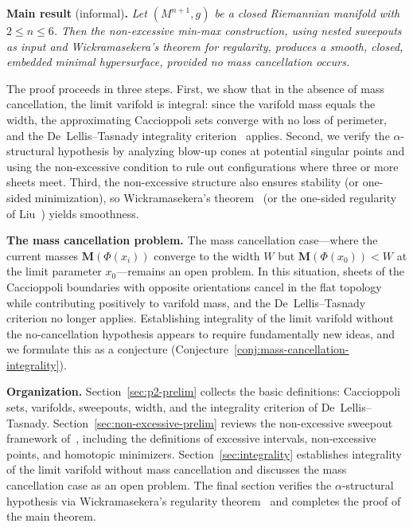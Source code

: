 \noindent\textbf{Main result} (informal)\textbf{.}
\textit{Let $(M^{n+1}, g)$ be a closed Riemannian manifold with $2 \leq n \leq 6$. Then the non-excessive min-max construction, using nested sweepouts as input and Wickramasekera's theorem for regularity, produces a smooth, closed, embedded minimal hypersurface, provided no mass cancellation occurs.}

The proof proceeds in three steps. First, we show that in the absence of mass cancellation, the limit varifold is integral: since the varifold mass equals the width, the approximating Caccioppoli sets converge with no loss of perimeter, and the De~Lellis--Tasnady integrality criterion~\cite[Proposition~A.1]{DLT13} applies. Second, we verify the $\alpha$-structural hypothesis by analyzing blow-up cones at potential singular points and using the non-excessive condition to rule out configurations where three or more sheets meet. Third, the non-excessive structure also ensures stability (or one-sided minimization), so Wickramasekera's theorem~\cite{Wic14} (or the one-sided regularity of Liu~\cite{Liu19}) yields smoothness.

\medskip
\noindent\textbf{The mass cancellation problem.}
The mass cancellation case---where the current masses $\mathbf{M}(\Phi(x_i))$ converge to the width $W$ but $\mathbf{M}(\Phi(x_0)) < W$ at the limit parameter $x_0$---remains an open problem. In this situation, sheets of the Caccioppoli boundaries with opposite orientations cancel in the flat topology while contributing positively to varifold mass, and the De~Lellis--Tasnady criterion no longer applies. Establishing integrality of the limit varifold without the no-cancellation hypothesis appears to require fundamentally new ideas, and we formulate this as a conjecture (Conjecture~\ref{conj:mass-cancellation-integrality}).

\medskip
\noindent\textbf{Organization.}
Section~\ref{sec:p2-prelim} collects the basic definitions: Caccioppoli sets, varifolds, sweepouts, width, and the integrality criterion of De~Lellis--Tasnady.
Section~\ref{sec:non-excessive-prelim} reviews the non-excessive sweepout framework of~\cite{CLS22}, including the definitions of excessive intervals, non-excessive points, and homotopic minimizers. Section~\ref{sec:integrality} establishes integrality of the limit varifold without mass cancellation and discusses the mass cancellation case as an open problem. The final section verifies the $\alpha$-structural hypothesis via Wickramasekera's regularity theorem~\cite{Wic14} and completes the proof of the main theorem.

